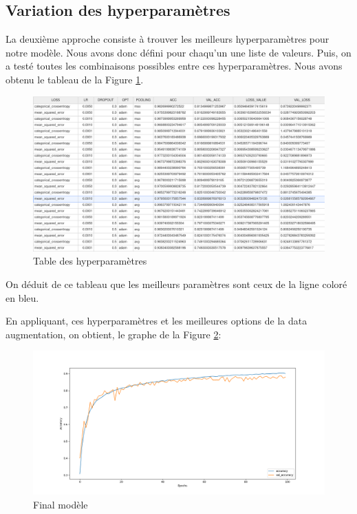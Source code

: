\documentclass[12pt,titlepage]{article}
\begin{document}
\subsection{Variation des hyperparamètres}

La deuxième approche consiste à trouver les meilleurs hyperparamètres pour notre modèle. Nous avons donc défini pour chaqu'un une liste de valeurs. Puis, on a testé toutes les combinaisons possibles entre ces hyperparamètres. Nous avons obtenu le tableau de la Figure \ref{csv}.

\begin{figure}[!h]
\centering
\includegraphics[width=1.0\textwidth]{img/csv.png}
\caption{Table des hyperparamètres}
\label{csv}
\end{figure}

On déduit de ce tableau que les meilleurs paramètres sont ceux de la ligne coloré en bleu.

En appliquant, ces hyperparamètres et les meilleures options de la data augmentation, on obtient, le graphe de la Figure \ref{final}:

\begin{figure}[!h]
\centering
\includegraphics[width=1.0\textwidth]{img/model-final-acc.png}
\caption{Final modèle}
\label{final}
\end{figure}
\end{document}
